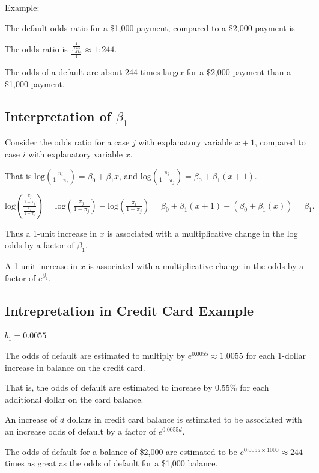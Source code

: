 \documentclass[]{book}
\begin{document}
Example:

The default odds ratio for a \$1,000 payment, compared to a \$2,000
payment is

The odds ratio is
\(\frac{\frac{1}{173}}{\frac{1.414}{1}}\approx 1:244.\)

The odds of a default are about 244 times larger for a \$2,000 payment
than a \$1,000 payment.

\subsection{\texorpdfstring{Interpretation of
\(\beta_1\)}{Interpretation of \textbackslash{}beta\_1}}\label{interpretation-of-beta_1}

Consider the odds ratio for a case \(j\) with explanatory variable
\(x + 1\), compared to case \(i\) with explanatory variable \(x\).

That is
\(\text{log}\left(\frac{\pi_i}{1-\pi_i}\right) = \beta_0+\beta_1x\), and
\(\text{log}\left(\frac{\pi_j}{1-\pi_j}\right) = \beta_0+\beta_1(x+1)\).

\(\text{log}\left(\frac{\frac{\pi_j}{1-\pi_j}}{\frac{\pi_i}{1-\pi_i}}\right)=\text{log}\left(\frac{\pi_j}{1-\pi_j}\right)-\text{log}\left(\frac{\pi_i}{1-\pi_j}\right)=\beta_0+\beta_1(x+1)-(\beta_0+\beta_1(x))=\beta_1.\)

Thus a 1-unit increase in \(x\) is associated with a multiplicative
change in the log odds by a factor of \(\beta_1\).

A 1-unit increase in \(x\) is associated with a multiplicative change in
the odds by a factor of \(e^{\beta_1}\).

\subsection{Intrepretation in Credit Card
Example}\label{intrepretation-in-credit-card-example}

\(b_1=0.0055\)

The odds of default are estimated to multiply by
\(e^{0.0055}\approx1.0055\) for each 1-dollar increase in balance on the
credit card.

That is, the odds of default are estimated to increase by 0.55\% for
each additional dollar on the card balance.

An increase of \(d\) dollars in credit card balance is estimated to be
associated with an increase odds of default by a factor of
\(e^{0.0055d}\).

The odds of default for a balance of \$2,000 are estimated to be
\(e^{0.0055\times 1000}\approx 244\) times as great as the odds of
default for a \$1,000 balance.
\end{document}
